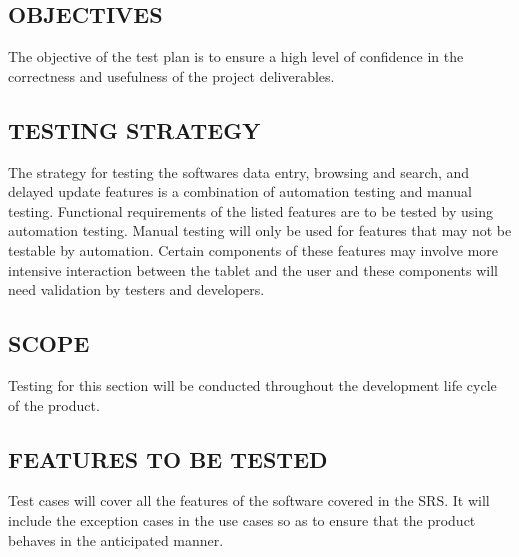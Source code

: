 \documentclass[twoside,letterpaper]{article}
\begin{document}
\subsection{OBJECTIVES}
{\rmfamily\color{black}
 The objective of the test plan is to ensure a high level of confidence in the correctness and usefulness of the project deliverables.}

\subsection{TESTING STRATEGY}
{\rmfamily\color{black}
        The strategy for testing the softwares data entry, browsing and search, and delayed update features is a combination of automation testing and manual testing. Functional requirements of the listed features are to be tested by using automation testing. Manual testing will only be used for features that may not be testable by automation. Certain components of these features may involve more intensive interaction between the tablet and the user and these components will need validation by testers and developers.}
        
\subsection{SCOPE}
{\rmfamily\color{black}
       Testing for this section will be conducted throughout the development life cycle of the product.
}

\subsection{FEATURES TO BE TESTED}
{\rmfamily\color{black}
Test cases will cover all the features of the software covered in the SRS.  It will include the exception cases in the use cases so as to ensure that the product behaves in the anticipated manner.
}
\end{document}
